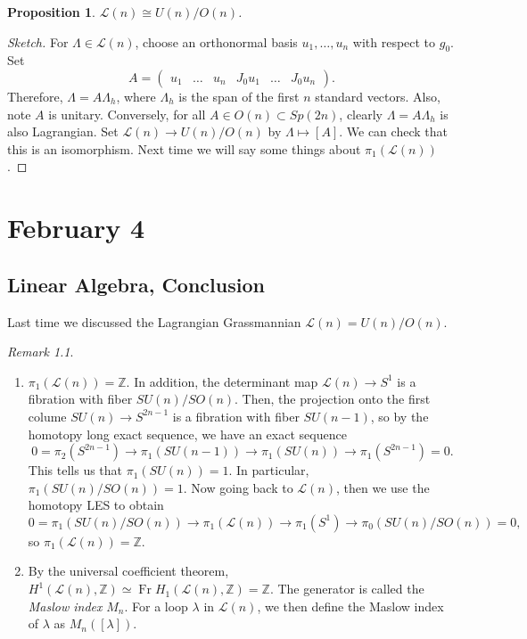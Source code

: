 \documentclass[leqno, openany]{memoir}
\newtheorem{prop}[thm]{Proposition}
\theoremstyle{definition}
\theoremstyle{remark}
\newtheorem{rmk}[thm]{Remark}
\theoremstyle{plain}
\theoremstyle{definition}
\theoremstyle{remark}
\newcommand{\Z}{\mathbb{Z}}
\newcommand{\mc}[1]{\mathcal{#1}}
\begin{document}
\begin{prop} $\mc{L}(n) \cong U(n)/O(n)$.  \end{prop}

\begin{proof}[Sketch] For $\Lambda \in \mc{L}(n)$, choose an orthonormal basis
    $u_1, \ldots, u_n$ with respect to $g_0$. Set \[ A = \begin{pmatrix} u_1 &
    \ldots & u_n & J_0 u_1 & \ldots & J_0 u_n \end{pmatrix}.\] Therefore,
    $\Lambda = A \Lambda_h$, where $\Lambda_h$ is the span of the first $n$
    standard vectors. Also, note $A$ is unitary. Conversely, for all $A \in
    O(n) \subset Sp(2n)$, clearly $\Lambda = A\Lambda_h$ is also Lagrangian.
    Set $\mc{L}(n) \to U(n)/O(n)$ by $\Lambda \mapsto [A]$. We can check that
    this is an isomorphism. Next time we will say some things about
    $\pi_1(\mc{L}(n))$.  \end{proof}

\chapter{February 4}%

\section{Linear Algebra, Conclusion}%

Last time we discussed the Lagrangian Grassmannian $\mc{L}(n) = U(n)/O(n)$.
\begin{rmk} \begin{enumerate} \item $\pi_1(\mc{L}(n)) = \Z$. In addition, the
    determinant map $\mc{L}(n) \to S^1$ is a fibration with fiber
    $SU(n)/SO(n)$. Then, the projection onto the first colume $SU(n) \to
    S^{2n-1}$ is a fibration with fiber $SU(n-1)$, so by the homotopy long
    exact sequence, we have an exact sequence \[ 0 = \pi_2(S^{2n-1}) \to
    \pi_1(SU(n-1)) \to \pi_1(SU(n)) \to \pi_1(S^{2n-1}) = 0.\] This tells us
    that $\pi_1(SU(n)) = 1$. In particular, $\pi_1(SU(n)/SO(n)) = 1$. Now going
    back to $\mc{L}(n)$, then we use the homotopy LES to obtain \[ 0 =
    \pi_1(SU(n)/SO(n)) \to \pi_1(\mc{L}(n)) \to \pi_1(S^1) \to
\pi_0(SU(n)/SO(n)) = 0, \] so $\pi_1(\mc{L}(n)) = \Z$.  \item By the universal
coefficient theorem, $H^1(\mc{L}(n), \Z) \simeq \operatorname{Fr}
H_1(\mc{L}(n), \Z) = \Z$. The generator is called the \textit{Maslow index}
$M_n$. For a loop $\lambda$ in $\mc{L}(n)$, we then define the Maslow index of
$\lambda$ as $M_n([\lambda])$.  \end{enumerate} \end{rmk}
\end{document}
